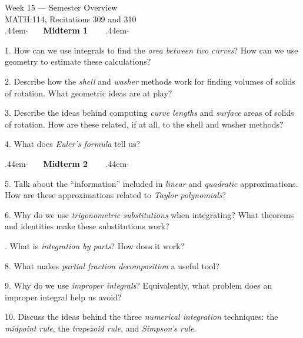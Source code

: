 \documentclass[10pt]{article}
\makeatletter
\newcommand\cdotfill{%
    \leavevmode\cleaders\hb@xt@.44em{\hss$\cdot$\hss}\hfill\kern\z@
}
\makeatother
\begin{document}
	{
		\centering
		\huge{Week 15 --- Semester Overview} \\
		\Large{MATH:114, Recitations 309 and 310} \\[2em]
	}
	\cdotfill \ \ \ \textbf{Midterm 1} \ \ \ \cdotfill
	
	\vspace{2em}
	1. How can we use integrals to find the \textit{area between two curves}? How can we use geometry to estimate these calculations?
	
	\vspace{0.1\textheight}
	2. Describe how the \textit{shell} and \textit{washer} methods work for finding volumes of solids of rotation. What geometric ideas are at play?
	
	\vspace{0.1\textheight}
	3. Describe the ideas behind computing \textit{curve lengths} and \textit{surface} areas of solids of rotation. How are these related, if at all, to the shell and washer methods?
	
	\vspace{0.1\textheight}
	4. What does \textit{Euler's formula} tell us?
	
	\vspace{0.1\textheight}
	\cdotfill \ \ \ \textbf{Midterm 2} \ \ \ \cdotfill
	
	\vspace{2em}
	5. Talk about the ``information'' included in \textit{linear} and \textit{quadratic} approximations. How are these approximations related to \textit{Taylor polynomials}?
	
	\vspace{0.1\textheight}
	6. Why do we use \textit{trigonometric substitutions} when integrating? What theorems and identities make these substitutions work?
	
	. What is \textit{integration by parts}? How does it work?
	
	
	\vspace{0.1\textheight}
	8. What makes \textit{partial fraction decomposition} a useful tool?
	
	\vspace{0.1\textheight}
	9. Why do we use \textit{improper integrals}? Equivalently, what problem does an improper integral help us avoid?
	
	\vspace{0.1\textheight}
	10. Discuss the ideas behind the three \textit{numerical integration} techniques: the \textit{midpoint rule}, the \textit{trapezoid rule}, and \textit{Simpson's rule}. 
	
\end{document}
